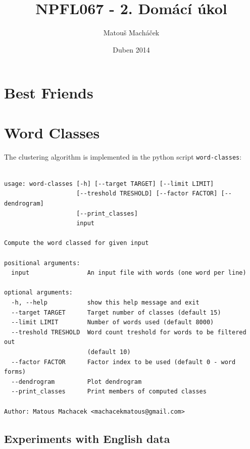 \documentclass[12pt,a4paper]{article}
\title{NPFL067 - 2. Domácí úkol}
\author{Matouš Macháček}
\date{Duben 2014}
\begin{document}
\maketitle

\section{Best Friends}


\section{Word Classes}

The clustering algorithm is implemented in the python script \texttt{word-classes}:
\begin{verbatim}

usage: word-classes [-h] [--target TARGET] [--limit LIMIT]
                    [--treshold TRESHOLD] [--factor FACTOR] [--dendrogram]
                    [--print_classes]
                    input

Compute the word classed for given input

positional arguments:
  input                An input file with words (one word per line)

optional arguments:
  -h, --help           show this help message and exit
  --target TARGET      Target number of classes (default 15)
  --limit LIMIT        Number of words used (default 8000)
  --treshold TRESHOLD  Word count treshold for words to be filtered out
                       (default 10)
  --factor FACTOR      Factor index to be used (default 0 - word forms)
  --dendrogram         Plot dendrogram
  --print_classes      Print members of computed classes

Author: Matous Machacek <machacekmatous@gmail.com>
\end{verbatim}

\subsection{Experiments with English data}
\end{document}
